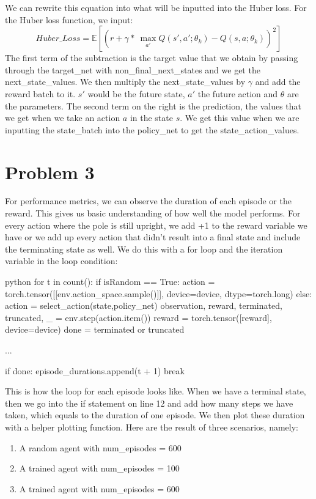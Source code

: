 \documentclass{article}
\numberwithin{equation}{section}
\numberwithin{equation}{section}
\def \E{\mathbb{E}}
\begin{document}
We can rewrite this equation into what will be inputted into the Huber loss.
For the Huber loss function, we input:
$$
Huber\_Loss = \E \left[ \left(r + \gamma *\ \max_{a'} Q(s',a'; \theta_k) - Q(s,a;\theta_k)\right)^2 \right]
$$
The first term of the subtraction is the target value that we obtain by passing through the target\_net with non\_final\_next\_states and we get the next\_state\_values. We then multiply the next\_state\_values by $\gamma$ and add the reward batch to it. $s'$ would be the future state, $a'$ the future action and $\theta$ are the parameters. The second term on the right is the prediction, the values that we get when we take an action $a$ in the state $s$. We get this value when we are inputting the state\_batch into the policy\_net to get the state\_action\_values. 










\section{Problem 3}
For performance metrics, we can observe the duration of each episode or the reward. This gives us basic understanding of how well the model performs. For every action where the pole is still upright, we add +1 to the reward variable we have or we add up every action that didn't result into a final state and include the terminating state as well. We do this with a for loop and the iteration variable in the loop condition:


\begin{mintedbox}{python}
for t in count():
	if isRandom  == True:
	  action = torch.tensor([[env.action_space.sample()]], device=device, dtype=torch.long)
	else:
	  action = select_action(state,policy_net)
	observation, reward, terminated, truncated, _ = env.step(action.item())
	reward = torch.tensor([reward], device=device)
	done = terminated or truncated

	...
	
	if done:
		episode_durations.append(t + 1)
		break
\end{mintedbox}

This is how the loop for each episode looks like. When we have a terminal state, then we go into the if statement on line 12 and add how many steps we have taken, which equals to the duration of one episode. We then plot these duration with a helper plotting function. Here are the result of three scenarios, namely:
\begin{enumerate}
\item A random agent with num\_episodes = 600
\item A trained agent with num\_episodes = 100
\item A trained agent with num\_episodes = 600
\end{enumerate}
\end{document}
